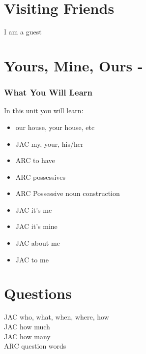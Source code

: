 \chapter*{Visiting Friends}
I am a guest\\
\index{}
\chapter*{Yours, Mine, Ours - }
\subsection{What You Will Learn}
In this unit you will learn:
\begin{itemize}
\item our house, your house, etc
\item JAC my, your, his/her
\item ARC to have
\item ARC possessives
\item ARC Possessive noun construction
\item JAC it's me
\item JAC it's mine
\item JAC about me
\item JAC to me
\end{itemize}\newpage

\newpage{}
\chapter*{Questions}
JAC who, what, when, where, how\\
JAC how much\\
JAC how many\\
ARC question words\\

